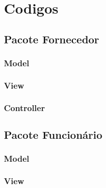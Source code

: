 \section{Codigos}


\subsection{Pacote Fornecedor}

\subsubsection{Model}


\subsubsection{View}



\subsubsection{Controller}



\subsection{Pacote Funcionário}

\subsubsection{Model}


\subsubsection{View}



